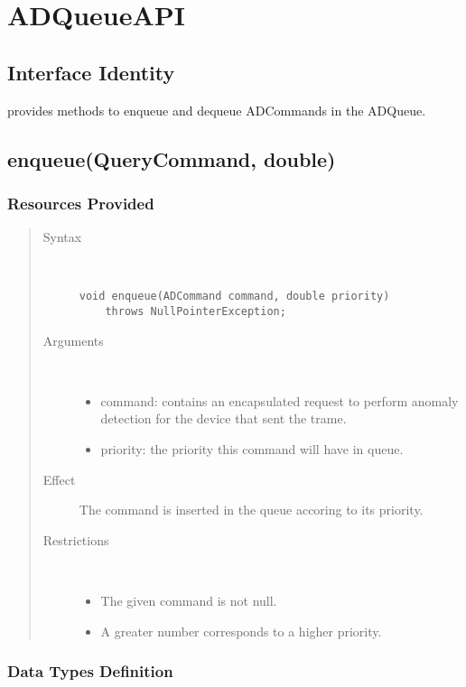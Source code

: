 \section{ADQueueAPI}

\subsection{Interface Identity}

\npar {} provides methods to enqueue and dequeue
ADCommands in the ADQueue.

\subsection{enqueue(QueryCommand, double)}

\subsubsection{Resources Provided}

\begin{quote}
	\begin{description}
		\item[Syntax] \ 
		\begin{verbatim}
void enqueue(ADCommand command, double priority) 
    throws NullPointerException;
		\end{verbatim}
		\item[Arguments] \
		\begin{itemize}
			\item command: contains an encapsulated request to perform anomaly detection
			for the device that sent the trame.
			\item priority: the priority this command will have in queue. 
		\end{itemize}
		\item[Effect] The command is inserted in the queue accoring to its priority.
		\item[Restrictions] \ 
		\begin{itemize}
			\item The given command is not null.
			\item A greater number corresponds to a higher priority. 
		\end{itemize}
	\end{description} 
\end{quote}

\subsubsection{Data Types Definition}

